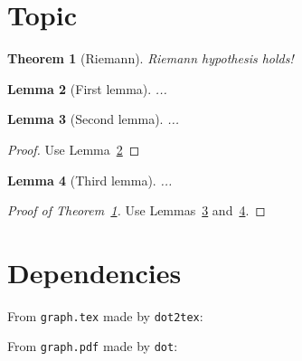 \documentclass{article}
\newtheorem{theorem}{Theorem}
\newtheorem{lemma}[theorem]{Lemma}
\begin{document}
\section{Topic}

\begin{theorem}[Riemann]\label{thm:riemann}
Riemann hypothesis holds!
\end{theorem}

\begin{lemma}[First lemma]\label{lem:1}
  ...
\end{lemma}

\begin{lemma}[Second lemma]\label{lem:2}
...
\end{lemma}
\begin{proof}
Use Lemma~\ref{lem:1}
\end{proof}

\begin{lemma}[Third lemma]\label{lem:3}
...
\end{lemma}

\begin{proof}[Proof of Theorem~\ref{thm:riemann}]
Use Lemmas~\ref{lem:2} and~\ref{lem:3}.
\end{proof}

\section{Dependencies}

From \texttt{graph.tex} made by \texttt{dot2tex}:


\bigskip

From \texttt{graph.pdf} made by \texttt{dot}:

\end{document}
